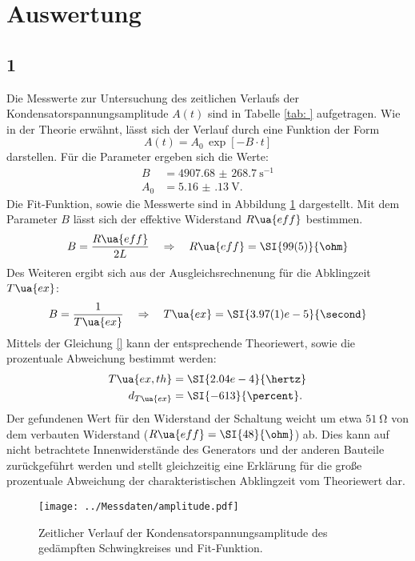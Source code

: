 \section{Auswertung}

\subsection{1}
Die Messwerte zur Untersuchung des zeitlichen Verlaufs der Kondensatorspannungsamplitude $A(t)$ sind in Tabelle \ref{tab: } aufgetragen. Wie in der Theorie erwähnt,
lässt sich der Verlauf durch eine Funktion der Form
\begin{equation}
  A(t) = A_0 \, \exp[-B\cdot t]
\end{equation}
darstellen. Für die Parameter ergeben sich die Werte:
\begin{align}
  B &= \SI{4907.68(26870)}{\second^{-1}}\\
  A_0 &= \SI{5.16(13)}{\volt}.
\end{align}
Die Fit-Funktion, sowie die Messwerte sind in Abbildung \ref{fig: amplitude} dargestellt.
Mit dem Parameter $B$ lässt sich der effektive Widerstand $R\ua{eff}$ bestimmen.
\begin{equation}
  B = \frac{R\ua{eff}}{2L} \quad \Rightarrow \quad R\ua{eff} =  \SI{99(5)}{\ohm}
  \label{eq: Fitparameter}
\end{equation}
Des Weiteren ergibt sich aus der Ausgleichsrechnenung für die Abklingzeit $T\ua{ex}$:
\begin{equation}
  B = \frac{1}{T\ua{ex}} \quad \Rightarrow \quad T\ua{ex} =  \SI{3.97(1)e-5}{\second}
\end{equation}
Mittels der Gleichung \eqref{} kann der entsprechende Theoriewert, sowie die prozentuale Abweichung bestimmt werden:
\begin{align}
  \begin{aligned}
  T\ua{ex, th} &= \SI{2.04e-4}{\hertz}\\
  d_{T\ua{ex}} &= \SI{-613}{\percent}.
\end{aligned}
\label{eq: theo_breite}
\end{align}
Der gefundenen Wert für den
Widerstand der Schaltung weicht um etwa $\SI{51}{\ohm}$ von dem verbauten Widerstand ($R\ua{eff} =  \SI{48}{\ohm}$) ab. Dies kann
auf nicht betrachtete Innenwiderstände des Generators und der anderen Bauteile zurückgeführt werden und stellt
gleichzeitig eine Erklärung für die große prozentuale Abweichung der charakteristischen Abklingzeit vom Theoriewert dar.

\begin{figure}
  \centering
  \texttt{[image: ../Messdaten/amplitude.pdf]}
  \caption{Zeitlicher Verlauf der Kondensatorspannungsamplitude des gedämpften Schwingkreises und Fit-Funktion.}
  \label{fig: amplitude}
\end{figure}

